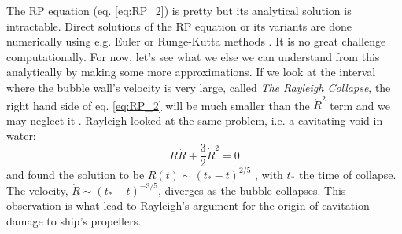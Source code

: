 \documentclass[prb,aps,nofootinbib,superscriptaddress,floatfix]{revtex4-2}
\begin{document}

The RP equation (eq. \ref{eq:RP_2}) is pretty but its analytical solution is intractable. Direct solutions of the RP equation or its variants are done numerically using e.g. Euler or Runge-Kutta methods \cite{yasui2018acoustic,yasui2015dynamics}. It is no great challenge computationally. For now, let's see what we else we can understand from this analytically by making some more approximations. If we look at the interval where the bubble wall's velocity is very large, called \emph{The Rayleigh Collapse}, the right hand side of eq. \ref{eq:RP_2} will be much smaller than the $\dot{R}^2$ term and we may neglect it \cite{rayleigh1917pressure,plesset1949dynamics,prosperetti1999old,brenner2002single}. 
Rayleigh looked at the same problem, i.e. a cavitating void in water:
\begin{equation}
    R\ddot{R}+\frac{3}{2}\dot{R}^2=0
    \label{eq:Rayleigh}
\end{equation}
and found the solution to be $R(t)\sim\left(t_*-t\right)^{2/5}$ \cite{brenner2002single}, with $t_*$ the time of collapse. The velocity, $\dot{R}\sim\left(t_*-t \right)^{-3/5}$, diverges as the bubble collapses. This observation is what lead to Rayleigh's argument for the origin of cavitation damage to ship's propellers. %
\end{document}
